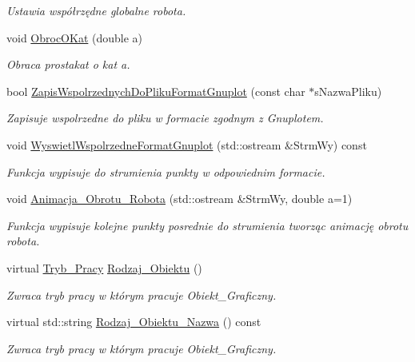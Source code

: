 \begin{DoxyCompactItemize}
\begin{DoxyCompactList}\small\item\em Ustawia współrzędne globalne robota. \end{DoxyCompactList}\item 
void \hyperlink{class_robot_a4d5ca83fe9dee72eddd8c6df97a0e10d}{Obroc\+O\+Kat} (double a)
\begin{DoxyCompactList}\small\item\em Obraca prostakat o kat a. \end{DoxyCompactList}\item 
bool \hyperlink{class_robot_a8e9a1014f600141e9a9514d6622b3394}{Zapis\+Wspolrzednych\+Do\+Pliku\+Format\+Gnuplot} (const char $\ast$s\+Nazwa\+Pliku)
\begin{DoxyCompactList}\small\item\em Zapisuje wspolrzedne do pliku w formacie zgodnym z Gnuplotem. \end{DoxyCompactList}\item 
\hypertarget{class_robot_a1a73604f8395ef66e6bf1e470108a77e}{void \hyperlink{class_robot_a1a73604f8395ef66e6bf1e470108a77e}{Wyswietl\+Wspolrzedne\+Format\+Gnuplot} (std\+::ostream \&Strm\+Wy) const }\label{class_robot_a1a73604f8395ef66e6bf1e470108a77e}

\begin{DoxyCompactList}\small\item\em Funkcja wypisuje do strumienia punkty w odpowiednim formacie. \end{DoxyCompactList}\item 
void \hyperlink{class_robot_a902a2c6e7e53d75b686a019a455916d8}{Animacja\+\_\+\+Obrotu\+\_\+\+Robota} (std\+::ostream \&Strm\+Wy, double a=1)
\begin{DoxyCompactList}\small\item\em Funkcja wypisuje kolejne punkty posrednie do strumienia tworząc animację obrotu robota. \end{DoxyCompactList}\item 
\hypertarget{class_robot_a47b44ae008d28df126ac8a69d5758352}{virtual \hyperlink{_objekt___graficzny_8hh_a59b4a471a7481f2a0551d90a8a745c9f}{Tryb\+\_\+\+Pracy} \hyperlink{class_robot_a47b44ae008d28df126ac8a69d5758352}{Rodzaj\+\_\+\+Obiektu} ()}\label{class_robot_a47b44ae008d28df126ac8a69d5758352}

\begin{DoxyCompactList}\small\item\em Zwraca tryb pracy w którym pracuje Obiekt\+\_\+\+Graficzny. \end{DoxyCompactList}\item 
\hypertarget{class_robot_a955063d9361dca5c55b98b74e075fe5d}{virtual std\+::string \hyperlink{class_robot_a955063d9361dca5c55b98b74e075fe5d}{Rodzaj\+\_\+\+Obiektu\+\_\+\+Nazwa} () const }\label{class_robot_a955063d9361dca5c55b98b74e075fe5d}

\begin{DoxyCompactList}\small\item\em Zwraca tryb pracy w którym pracuje Obiekt\+\_\+\+Graficzny. \end{DoxyCompactList}\end{DoxyCompactItemize}
